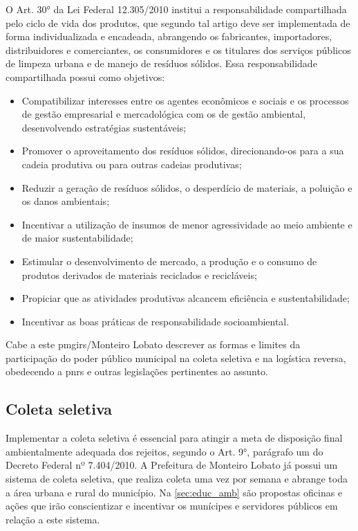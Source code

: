 O Art. 30° da Lei Federal 12.305/2010 institui a responsabilidade compartilhada pelo ciclo de vida dos produtos, que segundo tal artigo deve ser implementada de forma individualizada e encadeada, abrangendo os fabricantes, importadores, distribuidores e comerciantes, os consumidores e os titulares dos serviços públicos de limpeza urbana e de manejo de resíduos sólidos. Essa responsabilidade compartilhada possui como objetivos: \cite{brasil:12305} 

\begin{itemize}
	\item Compatibilizar interesses entre os agentes econômicos e sociais e os processos de gestão empresarial e mercadológica com os de gestão ambiental, desenvolvendo estratégias sustentáveis;
	\item Promover o aproveitamento dos resíduos sólidos, direcionando-os para a sua cadeia produtiva ou para outras cadeias produtivas;
	\item Reduzir a geração de resíduos sólidos, o desperdício de materiais, a poluição e os danos ambientais;
	\item Incentivar a utilização de insumos de menor agressividade ao meio ambiente e de maior sustentabilidade;
	\item Estimular o desenvolvimento de mercado, a produção e o consumo de produtos derivados de materiais reciclados e recicláveis;
	\item Propiciar que as atividades produtivas alcancem eficiência e sustentabilidade;
	\item Incentivar as boas práticas de responsabilidade socioambiental.    
\end{itemize}

Cabe a este \gls{pmgirs}/Monteiro Lobato descrever as formas e limites da participação do poder público municipal na coleta seletiva e na logística reversa, obedecendo a \gls{pnrs} e outras legislações pertinentes ao assunto. 

\subsection{Coleta seletiva}

Implementar a coleta seletiva é essencial para atingir a meta de disposição final ambientalmente adequada dos rejeitos, segundo o Art. 9°, parágrafo um do Decreto Federal nº 7.404/2010. A Prefeitura de Monteiro Lobato já possui um sistema de coleta seletiva, que realiza coleta uma vez por semana e abrange toda a área urbana e rural do município. Na \autoref{sec:educ_amb} são propostas oficinas e ações que irão conscientizar e incentivar os munícipes e servidores públicos em relação a este sistema. 


